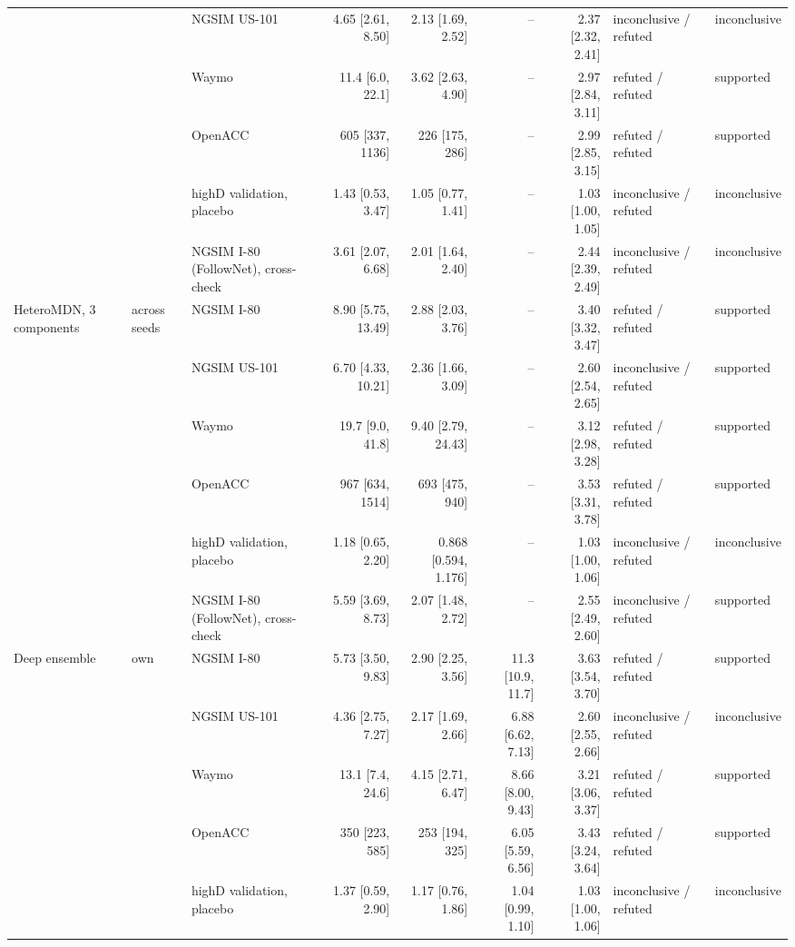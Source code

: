 \begin{longtable}{lllrrrrll}
 &  & NGSIM US-101 & 4.65 [2.61, 8.50] & 2.13 [1.69, 2.52] & -- & 2.37 [2.32, 2.41] & inconclusive / refuted & inconclusive \\
 &  & Waymo & 11.4 [6.0, 22.1] & 3.62 [2.63, 4.90] & -- & 2.97 [2.84, 3.11] & refuted / refuted & supported \\
 &  & OpenACC & 605 [337, 1136] & 226 [175, 286] & -- & 2.99 [2.85, 3.15] & refuted / refuted & supported \\
 &  & highD validation, placebo & 1.43 [0.53, 3.47] & 1.05 [0.77, 1.41] & -- & 1.03 [1.00, 1.05] & inconclusive / refuted & inconclusive \\
 &  & NGSIM I-80 (FollowNet), cross-check & 3.61 [2.07, 6.68] & 2.01 [1.64, 2.40] & -- & 2.44 [2.39, 2.49] & inconclusive / refuted & inconclusive \\
\midrule
HeteroMDN, 3 components & across seeds & NGSIM I-80 & 8.90 [5.75, 13.49] & 2.88 [2.03, 3.76] & -- & 3.40 [3.32, 3.47] & refuted / refuted & supported \\
 &  & NGSIM US-101 & 6.70 [4.33, 10.21] & 2.36 [1.66, 3.09] & -- & 2.60 [2.54, 2.65] & inconclusive / refuted & supported \\
 &  & Waymo & 19.7 [9.0, 41.8] & 9.40 [2.79, 24.43] & -- & 3.12 [2.98, 3.28] & refuted / refuted & supported \\
 &  & OpenACC & 967 [634, 1514] & 693 [475, 940] & -- & 3.53 [3.31, 3.78] & refuted / refuted & supported \\
 &  & highD validation, placebo & 1.18 [0.65, 2.20] & 0.868 [0.594, 1.176] & -- & 1.03 [1.00, 1.06] & inconclusive / refuted & inconclusive \\
 &  & NGSIM I-80 (FollowNet), cross-check & 5.59 [3.69, 8.73] & 2.07 [1.48, 2.72] & -- & 2.55 [2.49, 2.60] & inconclusive / refuted & supported \\
\midrule
Deep ensemble & own & NGSIM I-80 & 5.73 [3.50, 9.83] & 2.90 [2.25, 3.56] & 11.3 [10.9, 11.7] & 3.63 [3.54, 3.70] & refuted / refuted & supported \\
 &  & NGSIM US-101 & 4.36 [2.75, 7.27] & 2.17 [1.69, 2.66] & 6.88 [6.62, 7.13] & 2.60 [2.55, 2.66] & inconclusive / refuted & inconclusive \\
 &  & Waymo & 13.1 [7.4, 24.6] & 4.15 [2.71, 6.47] & 8.66 [8.00, 9.43] & 3.21 [3.06, 3.37] & refuted / refuted & supported \\
 &  & OpenACC & 350 [223, 585] & 253 [194, 325] & 6.05 [5.59, 6.56] & 3.43 [3.24, 3.64] & refuted / refuted & supported \\
 &  & highD validation, placebo & 1.37 [0.59, 2.90] & 1.17 [0.76, 1.86] & 1.04 [0.99, 1.10] & 1.03 [1.00, 1.06] & inconclusive / refuted & inconclusive \\

\end{longtable}

